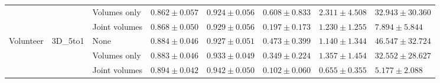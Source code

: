 \begin{sidewaystable}[htbp]
\begin{tabular}{l*{7}{l}}
                &                	& Volumes only  & $0.862 \pm 0.057$ & $0.924 \pm 0.056$ & $0.608 \pm 0.833$ & $2.311  \pm 4.508 $ & $32.943 \pm 30.360$ \\
                &                	& Joint volumes      & $\mathbf{0.868 \pm 0.050}$ & $\mathbf{0.929 \pm 0.056}$ & $\mathbf{0.197 \pm 0.173}$ & $\mathbf{1.230  \pm 1.255}$ & $\mathbf{7.894  \pm 5.844}$ \\
      \midrule
      Volunteer & 3D\_5to1 	& None & $0.884 \pm 0.046$ & $0.927 \pm 0.051$ & $0.473 \pm 0.399$ & $1.140  \pm 1.344 $ & $46.547 \pm 32.724$ \\
                &                	& Volumes only  & $0.883 \pm 0.046$ & $0.933 \pm 0.049$ & $0.349 \pm 0.224$ & $1.357  \pm 1.454 $ & $32.552 \pm 28.627$ \\
                &                	& Joint volumes      & $\mathbf{0.894 \pm 0.042}$ & $\mathbf{0.942 \pm 0.050}$ & $\mathbf{0.102 \pm 0.060}$ & $\mathbf{0.655  \pm 0.355}$ & $\mathbf{5.177  \pm 2.088}$ \\
      \bottomrule
   \end{tabular}
   \label{tab:results_pp}
\end{sidewaystable}

\begin{figure}[htbp]
	\centering
	\hfill
	\caption[Post-processing impact on DICE]{}
	\label{fig:pp_boxplots_dice}  
\end{figure}

\begin{figure}[htbp]
	\centering
	\hfill
	\caption[Post-processing impact on VS]{}
	\label{fig:pp_boxplots_vs}  
\end{figure}

\begin{figure}[htbp]
	\centering
	\hfill
	\caption[Post-processing impact on AVD]{}
	\label{fig:pp_boxplots_avd}  
\end{figure}

